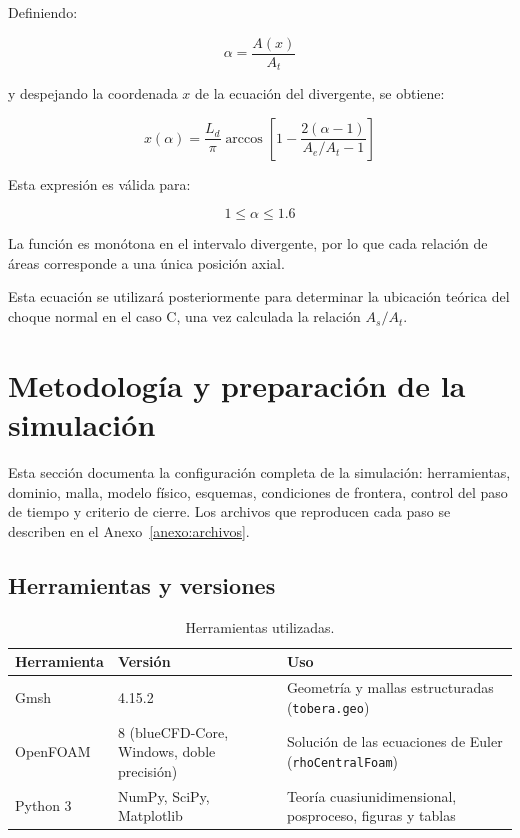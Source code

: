 \documentclass[12pt,letterpaper]{article}
\numberwithin{equation}{section}
\begin{document}
Definiendo:

\begin{equation}
\alpha=\frac{A(x)}{A_t}
\end{equation}

y despejando la coordenada $x$
de la ecuación del divergente,
se obtiene:

\begin{equation}
\boxed{
x(\alpha)=
\frac{L_d}{\pi}
\arccos\left[
1-\frac{2(\alpha-1)}
{A_e/A_t-1}
\right]
}
\label{eq:inversa_area_posicion}
\end{equation}

Esta expresión es válida para:

\begin{equation}
1\leq\alpha\leq1.6
\end{equation}

La función es monótona en
el intervalo divergente,
por lo que cada relación
de áreas corresponde
a una única posición axial.

Esta ecuación se utilizará
posteriormente para determinar
la ubicación teórica del choque
normal en el caso C, una vez
calculada la relación $A_s/A_t$.

\newpage
\section{Metodología y preparación de la simulación}
\label{sec:metodologia}

Esta sección documenta la configuración completa de la simulación: herramientas, dominio, malla, modelo físico, esquemas, condiciones de frontera, control del paso de tiempo y criterio de cierre. Los archivos que reproducen cada paso se describen en el Anexo~\ref{anexo:archivos}.

\subsection{Herramientas y versiones}

\begin{table}[H]
\centering
\caption{Herramientas utilizadas.}
\label{tab:herramientas}
\renewcommand{\arraystretch}{1.2}
\small
\begin{tabular}{p{2.6cm}p{5.2cm}p{6.6cm}}
\toprule
\textbf{Herramienta} & \textbf{Versión} & \textbf{Uso} \\
\midrule
Gmsh & 4.15.2 & Geometría y mallas estructuradas (\texttt{tobera.geo}) \\
OpenFOAM & 8 (blueCFD-Core, Windows, doble precisión) & Solución de las ecuaciones de Euler (\texttt{rhoCentralFoam}) \\
Python 3 & NumPy, SciPy, Matplotlib & Teoría cuasiunidimensional, posproceso, figuras y tablas \\
\bottomrule
\end{tabular}
\end{table}
\end{document}
